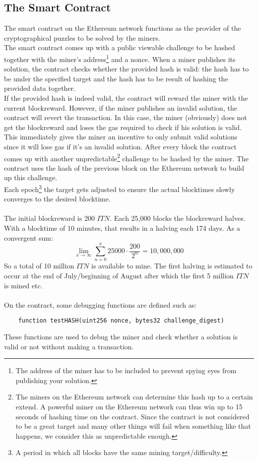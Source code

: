 \documentclass{article}
\begin{document}
\subsection{The Smart Contract}
The smart contract on the Ethereum network functions as the provider of the cryptographical puzzles to be solved by the miners. \\
The smart contract comes up with a public viewable challenge to be hashed together with the miner's address\footnote{The address of the miner has to be included to prevent spying eyes from publishing your solution.} and a nonce. When a miner publishes its solution, the contract checks whether the provided hash is valid: the hash has to be under the specified target and the hash has to be result of hashing the provided data together. \\
If the provided hash is indeed valid, the contract will reward the miner with the current blockreward. However, if the miner publishes an invalid solution, the contract will revert the transaction. In this case, the miner (obviously) does not get the blockreward and loses the gas required to check if his solution is valid. This immediately gives the miner an incentive to only submit valid solutions since it will lose gas if it's an invalid solution. After every block the contract comes up with another unpredictable\footnote{The miners on the Ethereum network can determine this hash up to a certain extend. A powerful miner on the Ethereum network can thus win up to 15 seconds of hashing time on the contract. Since the contract is not considered to be a great target and many other things will fail when something like that happens, we consider this as unpredictable enough.} challenge to be hashed by the miner. The contract uses the hash of the previous block on the Ethereum network to build up this challenge. \\
Each epoch\footnote{A period in which all blocks have the same mining target/difficulty.} the target gets adjusted to ensure the actual blocktimes slowly converges to the desired blocktime. \\
\\
The initial blockreward is 200 $ITN$. Each 25,000 blocks the blockreward halves. With a blocktime of 10 minutes, that results in a halving each 174 days. As a convergent sum: $$\lim_{x\to\infty} \sum_{n=0}^{x} 25000 \cdot \frac{200}{2^n} = 10,000,000$$ So a total of 10 million $ITN$ is available to mine. The first halving is estimated to occur at the end of July/beginning of August after which the first 5 million $ITN$ is mined etc. \\ \\
On the contract, some debugging functions are defined such as: \begin{verbatim}
    function testHASH(uint256 nonce, bytes32 challenge_digest)
\end{verbatim}  
These functions are used to debug the miner and check whether a solution is valid or not without making a transaction.
\end{document}
